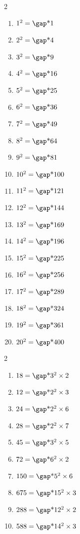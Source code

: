 \documentclass[10pt,a4paper,openany,twoside, eleve]{book}
\begin{document}
\begin{exercicesnofoot}
	\begin{exo}
		\begin{multicols}{2}
		\begin{enumerate}[label={}]
			\item $1^2 = \troum{1}$
			\item $2^2 = \troum{4}$
			\item $3^2 = \troum{9}$
			\item $4^2 = \troum{16}$
			\item $5^2 = \troum{25}$
			\item $6^2 = \troum{36}$
			\item $7^2 = \troum{49}$
			\item $8^2 = \troum{64}$
			\item $9^2 = \troum{81}$
			\item $10^2 = \troum{100}$
			\item $11^2 = \troum{121}$
			\item $12^2 = \troum{144}$
			\item $13^2 = \troum{169}$
			\item $14^2 = \troum{196}$
			\item $15^2 = \troum{225}$
			\item $16^2 = \troum{256}$
			\item $17^2 = \troum{289}$
			\item $18^2 = \troum{324}$
			\item $19^2 = \troum{361}$
			\item $20^2 = \troum{400}$
			\end{enumerate}
		\end{multicols}
	\end{exo}

	\begin{exo}
		\begin{multicols}{2}
			\begin{enumerate}[label={}]
			\item $18 = \troum{3^2 \times 2}$
			\item $12 = \troum{2^2 \times 3}$
			\item $24 = \troum{2^2 \times 6}$
			\item $28 = \troum{2^2 \times 7}$
			\item $45 = \troum{3^2 \times 5}$
			\item $72 = \troum{6^2 \times 2}$
			\item $150 = \troum{5^2 \times 6}$
			\item $675 = \troum{15^2 \times 3}$
			\item $288 = \troum{12^2 \times 2}$
			\item $588 = \troum{14^2 \times 3}$
			\end{enumerate}
			\end{multicols}
				\end{exo}


\end{exercicesnofoot}
\end{document}
